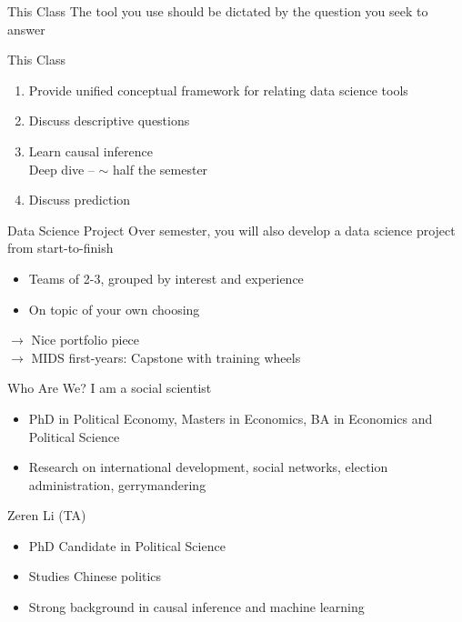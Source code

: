 \documentclass[11pt]{beamer}
\begin{document}
\begin{frame}[c]{This Class}
The tool you use should be dictated by the question you seek to answer
\end{frame}

\begin{frame}[c]{This Class}
\begin{enumerate}
  \item Provide unified conceptual framework for relating data science tools\\
  \item Discuss descriptive questions \\
  \item Learn causal inference \\
  {\color{gray} Deep dive -- $\sim$ half the semester}
  \item Discuss prediction \\
\end{enumerate}
\end{frame}

\begin{frame}[c]{Data Science Project}
Over semester, you will also develop a data science project from start-to-finish
\begin{itemize}
  \item Teams of 2-3, grouped by interest and experience
  \item On topic of your own choosing
\end{itemize}
\pause $\rightarrow$ Nice portfolio piece\\
\pause $\rightarrow$ MIDS first-years: Capstone with training wheels
\end{frame}

\begin{frame}[c]{Who Are We?}
  	I am a social scientist
  	\begin{itemize}
  		\pause \item PhD in Political Economy, Masters in Economics, BA in Economics and Political Science
      \item Research on international development, social networks, election administration, gerrymandering
  	\end{itemize}
    \vspace*{0.5cm}
    \pause Zeren Li (TA)
    \begin{itemize}
      \pause \item PhD Candidate in Political Science
       \item Studies Chinese politics
       \item Strong background in causal inference and machine learning
    \end{itemize}
\end{frame}
\end{document}
